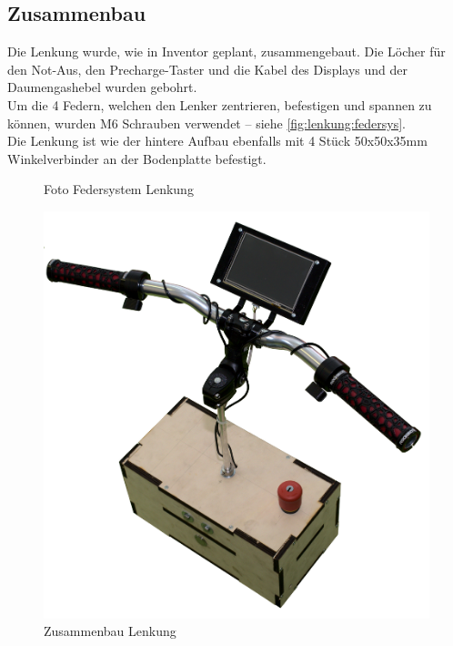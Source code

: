 \subsection{Zusammenbau}
Die Lenkung wurde, wie in Inventor geplant, zusammengebaut. Die Löcher für den Not-Aus, den Precharge-Taster und die Kabel des Displays und der Daumengashebel wurden gebohrt.\\
Um die 4 Federn, welchen den Lenker zentrieren, befestigen und spannen zu können, wurden M6 Schrauben verwendet -- siehe \autoref{fig:lenkung:federsys}.\\
Die Lenkung ist wie der hintere Aufbau ebenfalls mit 4 Stück 50x50x35mm Winkelverbinder an der Bodenplatte befestigt.
\begin{figure}[H]
    \centering
    \caption{Foto Federsystem Lenkung \label{fig:lenkung:federsys}}
\end{figure}
\begin{figure}[H]
    \centering
    \includegraphics[width=.99\textwidth]{Fotos/Konstruktion/DSC_8590.png}
    \caption{Zusammenbau Lenkung}
\end{figure}

\clearpage

